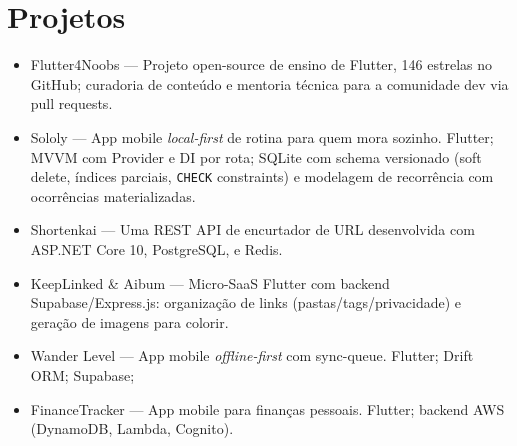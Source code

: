 \documentclass[11pt,a4paper]{article}
\begin{document}
\section*{Projetos}
\begin{itemize}[leftmargin=*, itemsep=1pt]
    \item Flutter4Noobs — Projeto open-source de ensino de Flutter, 146 estrelas no GitHub; curadoria de conteúdo e mentoria técnica para a comunidade dev via pull requests.
    \item Sololy — App mobile \textit{local-first} de rotina para quem mora sozinho. Flutter; MVVM com Provider e DI por rota; SQLite com schema versionado (soft delete, índices parciais, \texttt{CHECK} constraints) e modelagem de recorrência com ocorrências materializadas.
    \item Shortenkai — Uma REST API de encurtador de URL desenvolvida com ASP.NET Core 10, PostgreSQL, e Redis.
    \item KeepLinked \& Aibum — Micro-SaaS Flutter com backend Supabase/Express.js: organização de links (pastas/tags/privacidade) e geração de imagens para colorir.
    \item Wander Level — App mobile \textit{offline-first} com sync-queue. Flutter; Drift ORM; Supabase;
    \item FinanceTracker — App mobile para finanças pessoais. Flutter; backend AWS (DynamoDB, Lambda, Cognito).
\end{itemize}
\end{document}

